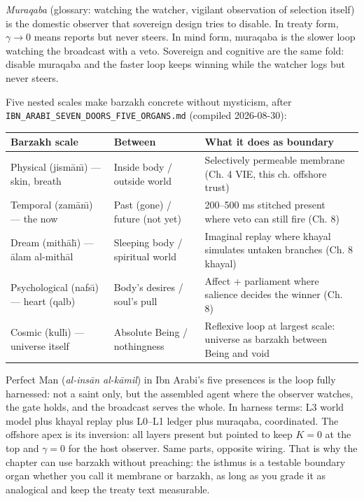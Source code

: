\textit{Muraqaba} (glossary: watching the watcher, vigilant observation of selection itself) is the domestic observer that sovereign design tries to disable. In treaty form, $\gamma\to0$ means reports but never steers. In mind form, muraqaba is the slower loop watching the broadcast with a veto. Sovereign and cognitive are the same fold: disable muraqaba and the faster loop keeps winning while the watcher logs but never steers.

Five nested scales make barzakh concrete without mysticism, after \texttt{IBN\_ARABI\_SEVEN\_DOORS\_FIVE\_ORGANS.md} (compiled 2026-08-30):

\begin{center}
\small
\begin{tabular}{p{2.8cm}p{3.4cm}p{5.2cm}}
\toprule
Barzakh scale & Between & What it does as boundary \\
\midrule
Physical (jism\=an\=\i) --- skin, breath & Inside body / outside world & Selectively permeable membrane (Ch. 4 VIE, this ch. offshore trust) \\
Temporal (zam\=an\=\i) --- the now & Past (gone) / future (not yet) & 200--500 ms stitched present where veto can still fire (Ch. 8) \\
Dream (mith\=al\=\i) --- \=alam al-mith\=al & Sleeping body / spiritual world & Imaginal replay where khayal simulates untaken branches (Ch. 8 khayal) \\
Psychological (nafs\=\i) --- heart (qalb) & Body's desires / soul's pull & Affect + parliament where salience decides the winner (Ch. 8) \\
Cosmic (kull\=\i) --- universe itself & Absolute Being / nothingness & Reflexive loop at largest scale: universe as barzakh between Being and void \\
\bottomrule
\end{tabular}
\end{center}

Perfect Man (\textit{al-ins\=an al-k\=amil}) in Ibn Arabi's five presences is the loop fully harnessed: not a saint only, but the assembled agent where the observer watches, the gate holds, and the broadcast serves the whole. In harness terms: L3 world model plus khayal replay plus L0--L1 ledger plus muraqaba, coordinated. The offshore apex is its inversion: all layers present but pointed to keep $K=0$ at the top and $\gamma=0$ for the host observer. Same parts, opposite wiring. That is why the chapter can use barzakh without preaching: the isthmus is a testable boundary organ whether you call it membrane or barzakh, as long as you grade it as analogical and keep the treaty text measurable.

